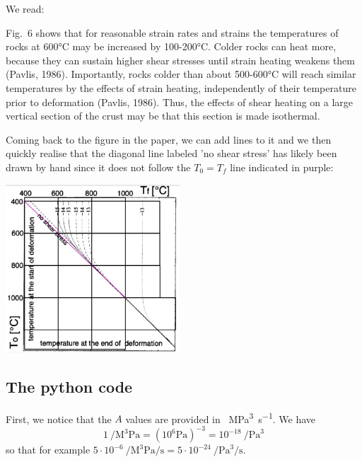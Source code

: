 We read:
\begin{displayquote}
{\color{darkgray}
Fig.~6 shows that for reasonable strain rates and strains the temperatures of rocks at 600\si{\celsius} 
may be increased by 100-200\si{\celsius}. 
Colder rocks can heat more, because they can sustain higher shear stresses until
strain heating weakens them (Pavlis, 1986). Importantly, rocks colder than about 500-600\si{\celsius} 
will reach similar temperatures by the effects of strain heating, independently
of their temperature prior to deformation (Pavlis, 1986). Thus, the effects of shear heating
on a large vertical section of the crust may be that
this section is made isothermal.}
\end{displayquote}

Coming back to the figure in the paper, we can add lines to it and 
we then quickly realise that the diagonal line labeled 'no shear stress'
has likely been drawn by hand since it does not follow the $T_0=T_f$ line
indicated in purple:

\begin{center}
\includegraphics[width=6.5cm]{python_codes/fieldstone_167/images/drawing.jpg} 
\end{center}



\newpage
\subsection*{The python code}

First, we notice that the $A$ values are provided in \si{\per\cubic\mega\pascal \per \second}.
We have 
\[
1~\si{\per\cubic\mega\pascal} = (10^6 \si{\pascal})^{-3} = 10^{-18}~\si{\per\cubic\pascal}
\] 
so that for example $5\cdot 10^{-6}~\si{\per\cubic\mega\pascal\per\second} 
= 5 \cdot 10^{-24}~\si{\per\cubic\pascal \per\second}$.

